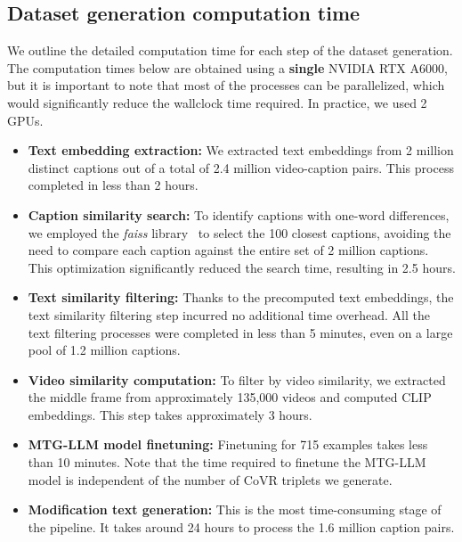 \subsection{Dataset generation computation time}
\label{app:subsec:dataset-computation-time}
We outline the detailed computation time for each step of the dataset generation. The computation times below are obtained using a \textbf{single} NVIDIA RTX A6000, but it is important to note that most of the processes can be parallelized, which would significantly reduce the wallclock time required. In practice, we used 2 GPUs. 
\begin{itemize}
    \item \textbf{Text embedding extraction:} We extracted text embeddings from 2 million distinct captions out of a total of 2.4 million video-caption pairs. This process completed in less than 2 hours.
    \item \textbf{Caption similarity search:} To identify captions with one-word differences, we employed the \textit{faiss} library~\cite{faiss_johnson2019billion} to select the 100 closest captions, avoiding the need to compare each caption against the entire set of 2 million captions. This optimization significantly reduced the search time, resulting in 2.5 hours.
    \item \textbf{Text similarity filtering:} Thanks to the precomputed text embeddings, the text similarity filtering step incurred no additional time overhead. All the text filtering processes were completed in less than 5 minutes, even on a large pool of 1.2 million captions.
    \item \textbf{Video similarity computation:} To filter by video similarity, we extracted the middle frame from approximately 135,000 videos and computed CLIP embeddings. This step takes approximately 3 hours.
    \item \textbf{MTG-LLM model finetuning:} Finetuning for 715 examples takes less than 10 minutes. Note that the time required to finetune the MTG-LLM model is independent of the number of CoVR triplets we generate.
    \item \textbf{Modification text generation:} This is the most time-consuming stage of the pipeline. It takes around 24 hours to process the 1.6 million caption pairs.
\end{itemize}



